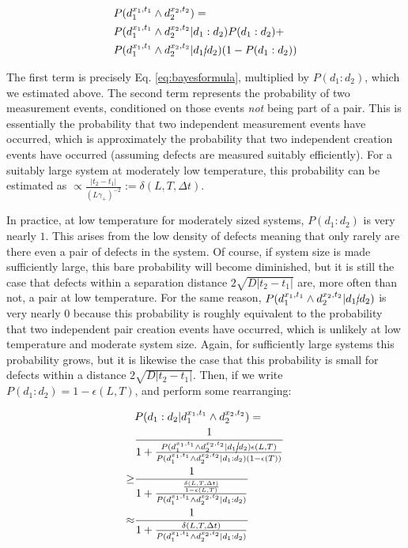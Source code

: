 \documentclass[twocolumn,superscriptaddress,aps,prb,floatfix]{revtex4-1}
\newcommand{\MS}[1]{{\color{mauve} {#1}}}
\begin{document}
\begin{align}
&P(d_1^{x_1,t_1}\wedge d_2^{x_2,t_2}) = \\ \notag
&P(d_1^{x_1,t_1} \wedge d_2^{x_2,t_2} | d_1:d_2) P(d_1 : d_2) + \\ \notag 
&P(d_1^{x_1,t_1} \wedge d_2^{x_2,t_2} | d_1\cancel{:}d_2) (1 - P(d_1 : d_2))
\end{align}

The first term is precisely Eq. \ref{eq:bayesformula}, \MS{multiplied by $P(d_1 : d_2)$, which we estimated above}.  The second term represents the probability of two measurement events, conditioned on those events \emph{not} being part of a pair.  This is essentially the probability that two independent measurement events have occurred, which is approximately the probability that two independent creation events have occurred (assuming defects are measured suitably efficiently).  For a suitably large system at moderately low temperature, this probability can be estimated as $\propto \frac{|t_2-t_1|}{(L \gamma_+)^{-2}}:=\delta(L,T,\Delta t)$.

In practice, at low temperature for moderately sized systems, $P(d_1 : d_2)$ is very nearly $1$.  This arises from the low density of defects meaning that only rarely are there even a pair of defects in the system.  Of course, if system size is made sufficiently large, this bare probability will become diminished, but it is still the case that defects within a separation distance $2\sqrt{D |t_2 - t_1|}$ are, more often than not, a pair at low temperature.  For the same reason, $P(d_1^{x_1,t_1} \wedge d_2^{x_2,t_2} | d_1\cancel{:}d_2)$ is very nearly $0$ because this probability is roughly equivalent to the probability that two independent pair creation events have occurred, which is unlikely at low temperature and moderate system size.  Again, for sufficiently large systems this probability grows, but it is likewise the case that this probability is small for defects within a distance $2\sqrt{D |t_2 - t_1|}$.  Then, if we write $P(d_1 : d_2) = 1 - \epsilon(L,T)$, and perform some rearranging:

\begin{align}
\label{eq:bayes_simple}
&P(d_1:d_2 | d_1^{x_1,t_1} \wedge d_2^{x_2,t_2}) = \\ \notag
&\frac{1}{1+\frac{P(d_1^{x_1,t_1} \wedge d_2^{x_2,t_2} | d_1\cancel{:}d_2) \epsilon(L,T)}{P(d_1^{x_1,t_1} \wedge d_2^{x_2,t_2} | d_1:d_2) (1-\epsilon(T))}} \\ \notag
\geq &\frac{1}{1+\frac{\frac{\delta(L,T,\Delta t)}{1-\epsilon(L,T)}} {P(d_1^{x_1,t_1} \wedge d_2^{x_2,t_2} | d_1:d_2)}} \\ \notag
\approx &\frac{1}{1+\frac{\delta(L,T,\Delta t)}{P(d_1^{x_1,t_1} \wedge d_2^{x_2,t_2} | d_1:d_2)}}
\end{align}
\end{document}
